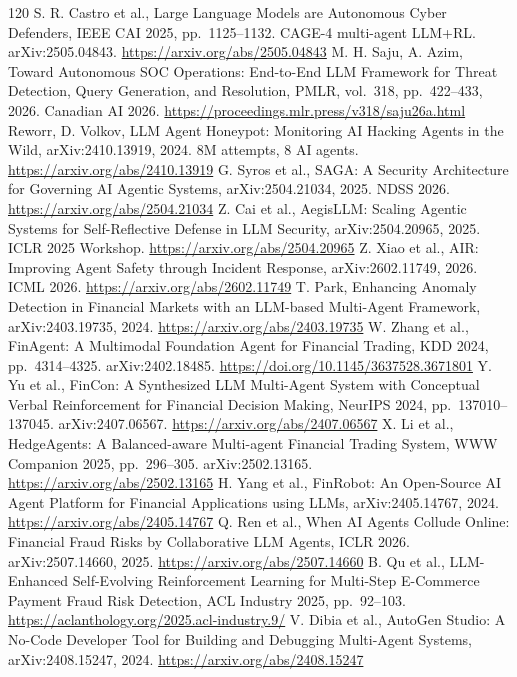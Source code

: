 \documentclass[11pt,a4paper]{article}
\begin{document}
\begin{thebibliography}{120}
 S. R. Castro et al., Large Language Models are Autonomous Cyber Defenders, IEEE CAI 2025, pp.~1125--1132. CAGE-4 multi-agent LLM+RL. arXiv:2505.04843. \url{https://arxiv.org/abs/2505.04843}
 M. H. Saju, A. Azim, Toward Autonomous SOC Operations: End-to-End LLM Framework for Threat Detection, Query Generation, and Resolution, PMLR, vol.~318, pp.~422--433, 2026. Canadian AI 2026. \url{https://proceedings.mlr.press/v318/saju26a.html}
 Reworr, D. Volkov, LLM Agent Honeypot: Monitoring AI Hacking Agents in the Wild, arXiv:2410.13919, 2024. 8M attempts, 8 AI agents. \url{https://arxiv.org/abs/2410.13919}
 G. Syros et al., SAGA: A Security Architecture for Governing AI Agentic Systems, arXiv:2504.21034, 2025. NDSS 2026. \url{https://arxiv.org/abs/2504.21034}
 Z. Cai et al., AegisLLM: Scaling Agentic Systems for Self-Reflective Defense in LLM Security, arXiv:2504.20965, 2025. ICLR 2025 Workshop. \url{https://arxiv.org/abs/2504.20965}
 Z. Xiao et al., AIR: Improving Agent Safety through Incident Response, arXiv:2602.11749, 2026. ICML 2026. \url{https://arxiv.org/abs/2602.11749}
 T. Park, Enhancing Anomaly Detection in Financial Markets with an LLM-based Multi-Agent Framework, arXiv:2403.19735, 2024. \url{https://arxiv.org/abs/2403.19735}
 W. Zhang et al., FinAgent: A Multimodal Foundation Agent for Financial Trading, KDD 2024, pp.~4314--4325. arXiv:2402.18485. \url{https://doi.org/10.1145/3637528.3671801}
 Y. Yu et al., FinCon: A Synthesized LLM Multi-Agent System with Conceptual Verbal Reinforcement for Financial Decision Making, NeurIPS 2024, pp.~137010--137045. arXiv:2407.06567. \url{https://arxiv.org/abs/2407.06567}
 X. Li et al., HedgeAgents: A Balanced-aware Multi-agent Financial Trading System, WWW Companion 2025, pp.~296--305. arXiv:2502.13165. \url{https://arxiv.org/abs/2502.13165}
 H. Yang et al., FinRobot: An Open-Source AI Agent Platform for Financial Applications using LLMs, arXiv:2405.14767, 2024. \url{https://arxiv.org/abs/2405.14767}
 Q. Ren et al., When AI Agents Collude Online: Financial Fraud Risks by Collaborative LLM Agents, ICLR 2026. arXiv:2507.14660, 2025. \url{https://arxiv.org/abs/2507.14660}
 B. Qu et al., LLM-Enhanced Self-Evolving Reinforcement Learning for Multi-Step E-Commerce Payment Fraud Risk Detection, ACL Industry 2025, pp.~92--103. \url{https://aclanthology.org/2025.acl-industry.9/}
 V. Dibia et al., AutoGen Studio: A No-Code Developer Tool for Building and Debugging Multi-Agent Systems, arXiv:2408.15247, 2024. \url{https://arxiv.org/abs/2408.15247}

\end{thebibliography}
\end{document}
